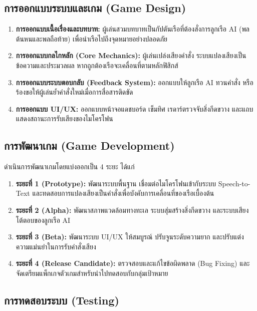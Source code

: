 \subsection{การออกแบบระบบและเกม (Game Design)}

\begin{enumerate}[label=(\arabic*)]
    \item \textbf{การออกแบบเนื้อเรื่องและบทบาท:} ผู้เล่นสวมบทบาทเป็นกัปตันเรือที่ต้องสั่งการลูกเรือ AI (พลต้นหนและพลถือท้าย) เพื่อนำเรือไปถึงจุดหมายอย่างปลอดภัย
    \item \textbf{การออกแบบกลไกหลัก (Core Mechanics):} ผู้เล่นเปล่งเสียงคำสั่ง ระบบแปลงเสียงเป็นข้อความและประมวลผล หากถูกต้องเรือจะเคลื่อนที่ตามหลักฟิสิกส์
    \item \textbf{การออกแบบระบบตอบกลับ (Feedback System):} ออกแบบให้ลูกเรือ AI ทวนคำสั่ง หรือร้องขอให้ผู้เล่นย้ำคำสั่งใหม่เมื่อการสื่อสารติดขัด
    \item \textbf{การออกแบบ UI/UX:} ออกแบบหน้าจอแดชบอร์ด เข็มทิศ เรดาร์ตรวจจับสิ่งกีดขวาง และแถบแสดงสถานะการรับเสียงของไมโครโฟน
\end{enumerate}

\subsection{การพัฒนาเกม (Game Development)}

ดำเนินการพัฒนาเกมโดยแบ่งออกเป็น 4 ระยะ ได้แก่

\begin{enumerate}[label=(\arabic*)]
    \item \textbf{ระยะที่ 1 (Prototype):} พัฒนาระบบพื้นฐาน เชื่อมต่อไมโครโฟนเข้ากับระบบ Speech-to-Text และทดสอบการแปลงเสียงเป็นคำสั่งเพื่อบังคับการเคลื่อนที่ของเรือเบื้องต้น
    \item \textbf{ระยะที่ 2 (Alpha):} พัฒนาสภาพแวดล้อมทางทะเล ระบบสุ่มสร้างสิ่งกีดขวาง และระบบเสียงโต้ตอบของลูกเรือ AI
    \item \textbf{ระยะที่ 3 (Beta):} พัฒนาระบบ UI/UX ให้สมบูรณ์ ปรับจูนระดับความยาก และปรับแต่งความแม่นยำในการรับคำสั่งเสียง
    \item \textbf{ระยะที่ 4 (Release Candidate):} ตรวจสอบและแก้ไขข้อผิดพลาด (Bug Fixing) และจัดเตรียมแพ็กเกจตัวเกมสำหรับนำไปทดสอบกับกลุ่มเป้าหมาย
\end{enumerate}

\subsection{การทดสอบระบบ (Testing)}

